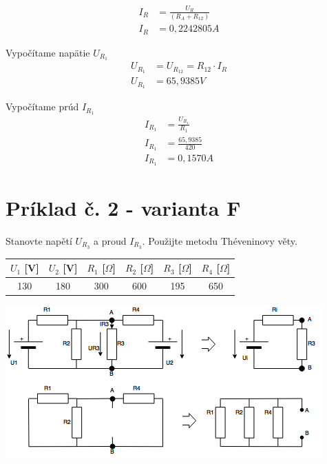 \documentclass[a4paper,11pt,titlepage]{article}
\begin{document}
\vspace{5mm}

\begin{align*}
I_R &= \frac{U_R}{(R_A + R_{12})} \\[10pt]
I_R &= 0,2242805A
\end{align*}

\vspace{5mm}

Vypočítame napätie $U_{R_1}$
\begin{align*}
U_{R_1} &= U_{R_{12}} = R_{12} \cdot I_R \\[10pt]
U_{R_1} &= 65,9385V
\end{align*}

\vspace{5mm}

Vypočítame prúd $I_{R_1}$
\begin{align*}
I_{R_1} &= \frac{U_{R_1}}{R_1} \\[10pt]
I_{R_1} &= \frac{65,9385}{420} \\[10pt]
I_{R_1} &= 0,1570A
\end{align*}

\newpage

\section{Príklad č. 2 - varianta F}

Stanovte napětí $U_{R_3}$ a proud $I_{R_3}$. Použijte metodu Théveninovy věty.

\vspace{5mm}

\begin{tabular}{ |c|c|c|c|c|c| } \hline
    $U_1$ [V] & $U_2$ [V] & $R_1$ [$\Omega$] & $R_2$ [$\Omega$] & $R_3$ [$\Omega$] & $R_4$ [$\Omega$]  \\ \hline
    130 & 180 & 300 & 600 & 195 & 650 \\ \hline
\end{tabular}

\vspace{5mm}

\includegraphics[scale=0.85]{diag.png}
\end{document}
